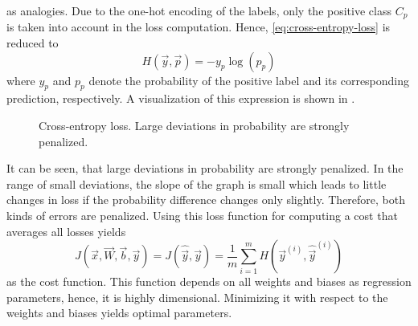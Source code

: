 as analogies.
Due to the one-hot encoding of the labels, only the positive class $C_p$ is taken into account in the loss computation.
Hence, \eqref{eq:cross-entropy-loss} is reduced to
\begin{equation}
	\label{eq:cross-entropy-loss-compact}
	H(\vec{y}, \vec{p}) = - y_p \log (p_p)
\end{equation}
where $y_p$ and $p_p$ denote the probability of the positive label and its corresponding prediction, respectively.
A visualization of this expression is shown in .
\begin{figure}
	\setlength{}
	\setlength{}
	\centering
	
	\caption[Cross-entropy loss]{Cross-entropy loss. Large deviations in probability are strongly penalized.}
	\label{fig:cross-entropy}
\end{figure}
It can be seen, that large deviations in probability are strongly penalized.
In the range of small deviations, the slope of the graph is small which leads to little changes in loss if the probability difference changes only slightly.
Therefore, both kinds of errors are penalized.
Using this loss function for computing a cost that averages all losses yields
\begin{equation}
	\label{eq:cross-entropy-cost}
	J(\vec{x}, \vec{W}, \vec{b}, \vec{y}) = J(\hat{\vec{y}}, \vec{y}) = \frac{1}{m} \sum_{i=1}^{m} H(\vec{y}^{(i)}, \hat{\vec{y}}^{(i)})
\end{equation}
as the cost function.
This function depends on all weights and biases as regression parameters, hence, it is highly dimensional.
Minimizing it with respect to the weights and biases yields optimal parameters.